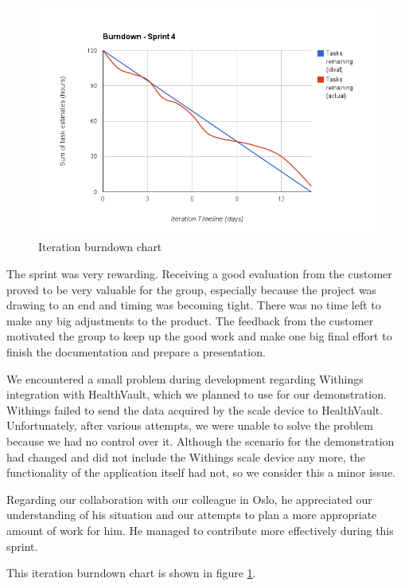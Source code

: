 \begin{figure}
\centering
\includegraphics[scale=0.60]{../Figures/burndownSprint4.png}
\caption{Iteration burndown chart}
\label{figure:burndownsprint4}
\end{figure}

The sprint was very rewarding.
Receiving a good evaluation from the customer proved to be very valuable for the group, especially because the project was drawing to an end and timing was becoming tight.
There was no time left to make any big adjustments to the product.
The feedback from the customer motivated the group to keep up the good work and make one big final effort to finish the documentation and prepare a presentation.

We encountered a small problem during development regarding Withings integration with HealthVault, which we planned to use for our demonstration. 
Withings failed to send the data acquired by the scale device to HealthVault. 
Unfortunately, after various attempts, we were unable to solve the problem because we had no control over it.
Although the scenario for the demonstration had changed and did not include the Withings scale device any more, the functionality of the application itself had not, so we consider this a minor issue.

Regarding our collaboration with our colleague in Oslo, he appreciated our understanding of his situation and our attempts to plan a more appropriate amount of work for him. 
He managed to contribute more effectively during this sprint.

This iteration burndown chart is shown in figure \ref{figure:burndownsprint4}.

